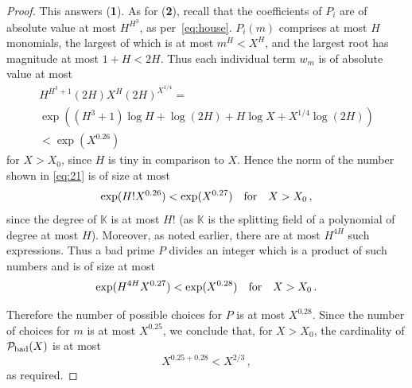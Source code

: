 \documentclass[10pt,a4paper]{amsart}
\begin{document}
\begin{proof}
This answers (\textbf{1}).
As for (\textbf{2}), recall that the coefficients of $P_i$ are of
absolute value at most 
$H^{H^3}$, as per~\eqref{eq:house}. $P_i(m)$ comprises at most $H$ monomials, the largest of which
is at most $m^H < X^H$, and the largest root has
magnitude at most
$1+H < 2H$.
Thus each individual term $w_m$ is of absolute value at most
\begin{multline*}
  H^{H^3+1} (2H) X^H (2H)^{X^{1/4}} = \\
  \exp\left((H^3+1)\log H + \log (2H) + H \log X + X^{1/4}\log (2H)
  \right)\\ <\exp(X^{0.26})
\end{multline*}
for $X>X_0$, since $H$ is tiny in comparison to $X$.
Hence the norm of the number shown in \eqref{eq:21} is of size at most 
\[
\exp(H! X^{0.26})<\exp(X^{0.27})\quad {\text{\rm for}}\quad X>X_0 \,
,
\]
since the degree of $\mathbb{K}$ is at most $H!$ (as $\mathbb{K}$ is
the splitting field of a polynomial of degree at most $H$).
Moreover, as noted
earlier, there are at most $H^{4H}$ such expressions.
Thus a bad prime $P$ divides an integer which is a product of such numbers and is of size at most 
\[
\exp(H^{4H} X^{0.27})<\exp(X^{0.28})\quad {\text{\rm for}}\quad
X>X_0 \, .
\]

Therefore the number of possible choices for $P$ is at most $X^{0.28}$. Since
the number of choices for $m$ is at most $X^{0.25}$, we conclude that,
for $X > X_0$,
the cardinality of $\mathcal{P}_{\text{\rm bad}}(X)$ is at most
\[
X^{0.25+0.28} < X^{2/3} \, ,
\]
as required.
\end{proof}
\end{document}
